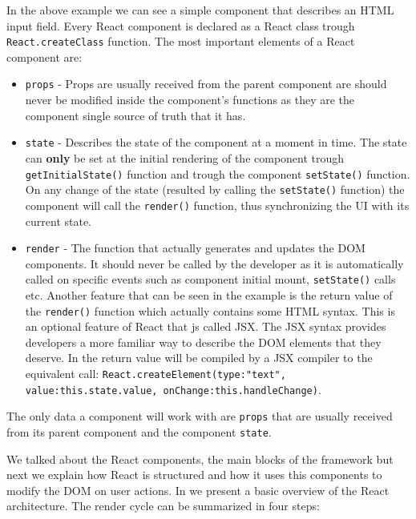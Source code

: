 In the above example we can see a simple component that describes an HTML input field. Every React component is declared as a React class trough \texttt{React.createClass} function. The most important elements of a React component are:
\begin{itemize}
	\item \texttt{props} - Props are usually received from the parent component are should never be modified inside the component's functions as they are the component single source of truth that it has.
	\item \texttt{state} - Describes the state of the component at a moment in time. The state can \textbf{only} be set at the initial rendering of the component trough \texttt{getInitialState()} function and trough the component \texttt{setState()} function. On any change of the state (resulted by calling the \texttt{setState()} function) the component will call the \texttt{render()} function, thus synchronizing the UI with its current state.
	\item \texttt{render} - The function that actually generates and updates the DOM components. It should never be called by the developer as it is automatically called on specific events such as component initial mount, \texttt{setState()} calls etc. Another feature that can be seen in the example is the return value of the \texttt{render()} function which actually contains some HTML syntax. This is an optional feature of React that js called JSX. The JSX syntax provides developers a more familiar way to describe the DOM elements that they deserve. In  the return value will be compiled by a JSX compiler to the equivalent call:
	\texttt{React.createElement(type:"text", value:this.state.value, onChange:this.handleChange)}.
\end{itemize}

The only data a component will work with are \texttt{props} that are  usually received from its parent component and the component \texttt{state}.

We talked about the React components, the main blocks of the framework but next we explain how React is structured and how it uses this components to modify the DOM on user actions. In  we present a basic overview of the React architecture. The render cycle can be summarized in four steps:

